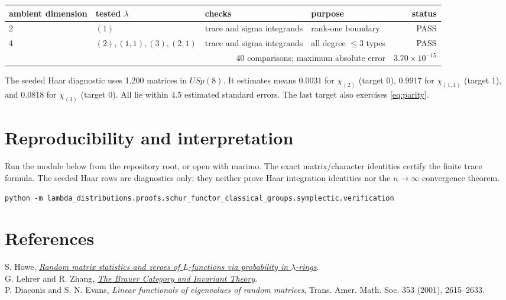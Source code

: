 \documentclass[11pt]{article}
\begin{document}
\begin{center}\small\begin{tabular}{@{}llllr@{}}\toprule
ambient dimension & tested $\lambda$ & checks & purpose & status\\\midrule
2 & $(1)$ & trace and sigma integrands & rank-one boundary & PASS\\
4 & $(2),(1,1),(3),(2,1)$ & trace and sigma integrands & all degree $\le3$ types & PASS\\\midrule
\multicolumn{4}{r}{40 comparisons; maximum absolute error} & $3.70\times10^{-15}$\\\bottomrule
\end{tabular}\end{center}

The seeded Haar diagnostic uses 1,200 matrices in $USp(8)$. It estimates means $0.0031$ for $\chi_{(2)}$ (target $0$), $0.9917$ for $\chi_{(1,1)}$ (target $1$), and $0.0818$ for $\chi_{(3)}$ (target $0$). All lie within $4.5$ estimated standard errors. The last target also exercises \eqref{eq:parity}.

\section{Reproducibility and interpretation}
Run the module below from the repository root, or open  with marimo. The exact matrix/character identities certify the finite trace formula.  The seeded Haar rows are diagnostics only; they neither prove Haar integration identities nor the $n\to\infty$ convergence theorem.
\begin{center}\footnotesize\texttt{python -m lambda\_distributions.proofs.schur\_functor\_classical\_groups.symplectic.verification}\end{center}

\section*{References}
S. Howe, \href{https://arxiv.org/abs/2412.19295}{\emph{Random matrix statistics and zeroes of $L$-functions via probability in $\lambda$-rings}}.\\
G. Lehrer and R. Zhang, \href{https://arxiv.org/abs/1207.5889}{\emph{The Brauer Category and Invariant Theory}}.
\\P. Diaconis and S. N. Evans, \emph{Linear functionals of eigenvalues of
random matrices}, Trans. Amer. Math. Soc. 353 (2001), 2615--2633.
\end{document}
